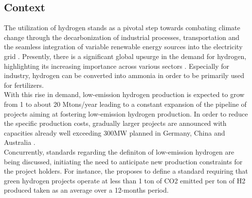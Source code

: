 \subsection{Context}

The utilization of hydrogen stands as a pivotal step towards combating climate change through the decarbonization of industrial processes, transportation and the seamless integration of variable renewable energy sources into the electricity grid \citep{shukla2022climate}.
Presently, there is a significant global upsurge in the demand for hydrogen, highlighting its increasing importance across various sectors \citep{iea_global_2022}. Especially for industry, hydrogen can be converted into ammonia in order to be primarily used for fertilizers. 
\\
With this rise in demand, low-emission hydrogen production is expected to grow from 1 to about 20 Mtons/year \citep{iea_global_2022} leading to a constant expansion of the pipeline of projects aiming at fostering low-emission hydrogen production. In order to reduce the specific production costs, gradually larger projects are announced with capacities already well exceeding 300MW planned in Germany, China and Australia \citep{iea_hydrogen_2023}.
\\
Concurrently, standards regarding the definiton of low-emission hydrogen are being discussed, initiating the need to anticipate new production constraints for the project holders. For instance, the \cite{green_hydrogen_organisation_green_2023} proposes to define a standard requiring that green hydrogen projects operate at less than 1 ton of CO2 emitted per ton of H2 produced taken as an average over a 12-months period.
\\

